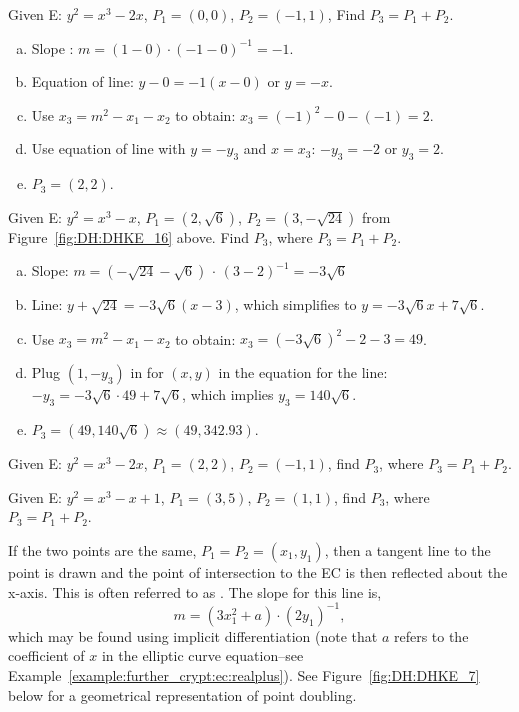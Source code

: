 \begin{example}\label{example:further_crypt:} 
Given E: $y^2 = x^3 - 2x$, $P_1 = (0,0)$, $P_2 = (-1,1)$, Find $P_3=P_1 + P_2$.
		
\begin{enumerate}[(a)]
\item
Slope :
$ m =(1 - 0) \cdot (-1- 0)^{-1}=-1$.
\item
Equation of line:	$y - 0 = -1(x- 0)$ or $y =-x $.
\item
Use $x_3 = m^2 - x_1 - x_2$ to obtain: $x_3 = (-1)^2 - 0 - (-1) = 2$.
\item
Use equation of line with $y=-y_3$ and $x=x_3$:  $-y_3 = -2$ or $y_3=2$.
\item
$P_3 = (2,2)$.
\end{enumerate}
\end{example}
\begin{example}\label{example:further_crypt:find P3} Given E: $y^2 = x^3 - x$, $P_1 = (2, \sqrt{6})$, $P_2 = (3, -\sqrt{24})$ from Figure~\ref{fig:DH:DHKE_16} above.
	Find $P_3$, where $P_3 = P_1 + P_2$.
\begin{enumerate}[(a)]
\item 
Slope: $m =( -\sqrt{24}-\sqrt{6})$ $\cdot$ $(3-2)^{-1} = -3\sqrt{6}  $ \\
\item
Line: $y + \sqrt{24} = -3\sqrt{6}(x - 3)$, which simplifies to $y = -3\sqrt{6}x + 7\sqrt{6}$.
\item 
Use $x_3 = m^2 - x_1 - x_2$ to obtain: $x_3 = (-3\sqrt{6})^2 - 2 - 3 = 49$.
\item
Plug $(1,-y_3)$ in for $(x,y)$ in the equation for the line: $-y_3 = -3\sqrt{6}\cdot 49+7 \sqrt{6}$, which implies $y_3 = 140\sqrt{6}$. 
\item
$P_3 = (49,140\sqrt{6}) \approx (49,342.93)$.
\end{enumerate}  
\end{example}

\begin{exercise}\label{exercise:further_crypt:} Given E: $y^2 = x^3 - 2x$, $P_1 = (2, 2)$, $P_2 = (-1, 1)$, find $P_3$, where $P_3 = P_1 + P_2$.
\end{exercise}

\begin{exercise}\label{exercise:further_crypt:} Given E: $y^2 = x^3 - x + 1$, $P_1 = (3, 5)$, $P_2 = (1, 1)$, find $P_3$, where $P_3 = P_1 + P_2$.
\end{exercise}

If the two points are the same, $P_1 = P_2 = (x_1,y_1)$, then a tangent line to the point is drawn and the point of intersection to the EC is then reflected about the x-axis.  This is often referred to as . The slope for this line is, 
\[m = (3x_1^2 + a) \cdot (2y_1)^{-1},\] 
which may be found using implicit differentiation (note that $a$ refers to the coefficient of $x$ in the elliptic curve equation--see Example~\ref{example:further_crypt:ec:realplus}).  See Figure~\ref{fig:DH:DHKE_7} below for a geometrical representation of point doubling.

